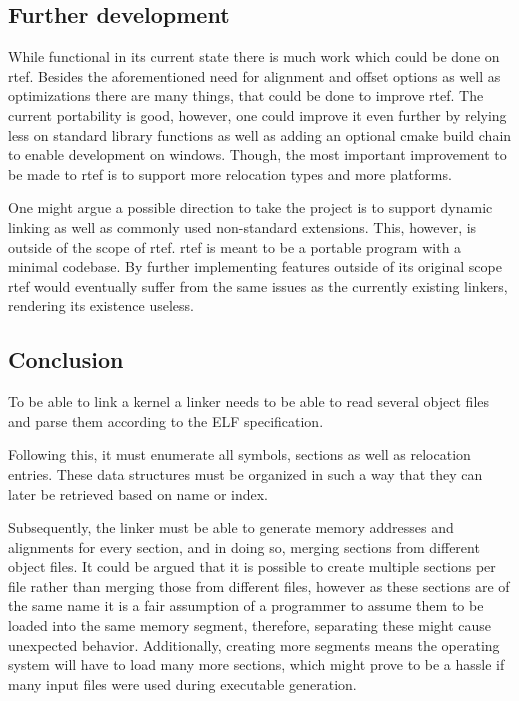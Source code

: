 \documentclass{article}
\begin{document}
\subsection{Further development}

While functional in its current state there is much work which could be done on rtef. Besides the aforementioned need for alignment and offset options as well as optimizations there are many things, that could be done to improve rtef. The current portability is good, however, one could improve it even further by relying less on standard library functions as well as adding an optional cmake build chain to enable development on windows. Though, the most important improvement to be made to rtef is to support more relocation types and more platforms.

One might argue a possible direction to take the project is to support dynamic linking as well as commonly used non-standard extensions. This, however, is outside of the scope of rtef. rtef is meant to be a portable program with a minimal codebase. By further implementing features outside of its original scope rtef would eventually suffer from the same issues as the currently existing linkers, rendering its existence useless.

\subsection{Conclusion}

To be able to link a kernel a linker needs to be able to read several object files and parse them according to the ELF specification.

Following this, it must enumerate all symbols, sections as well as relocation entries. These data structures must be organized in such a way that they can later be retrieved based on name or index.

Subsequently, the linker must be able to generate memory addresses and alignments for every section, and in doing so, merging sections from different object files. It could be argued that it is possible to create multiple sections per file rather than merging those from different files, however as these sections are of the same name it is a fair assumption of a programmer to assume them to be loaded into the same memory segment, therefore, separating these might cause unexpected behavior. Additionally, creating more segments means the operating system will have to load many more sections, which might prove to be a hassle if many input files were used during executable generation.
\end{document}
